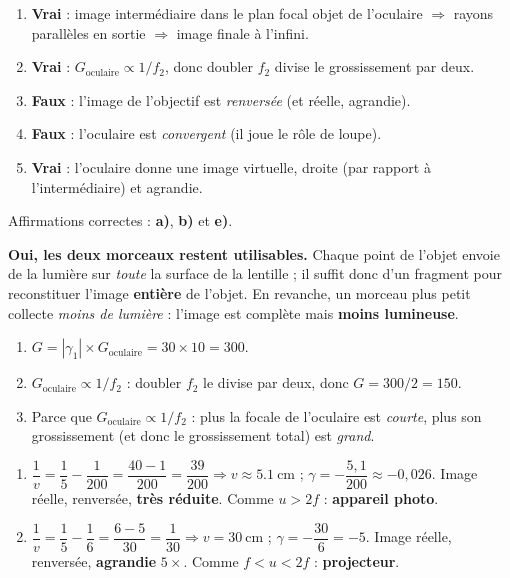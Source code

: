 \documentclass[11pt,a4paper]{article}
\begin{document}

\begin{corrige}
\begin{enumerate}[label=\alph*)]
  \item \textbf{Vrai} : image intermédiaire dans le plan focal objet de l'oculaire $\Rightarrow$
        rayons parallèles en sortie $\Rightarrow$ image finale à l'infini.
  \item \textbf{Vrai} : $G_{\text{oculaire}}\propto 1/f_2$, donc doubler $f_2$ divise le grossissement
        par deux.
  \item \textbf{Faux} : l'image de l'objectif est \emph{renversée} (et réelle, agrandie).
  \item \textbf{Faux} : l'oculaire est \emph{convergent} (il joue le rôle de loupe).
  \item \textbf{Vrai} : l'oculaire donne une image virtuelle, droite (par rapport à l'intermédiaire)
        et agrandie.
\end{enumerate}
Affirmations correctes : \textbf{a)}, \textbf{b)} et \textbf{e)}.
\end{corrige}

\begin{corrige}
\textbf{Oui, les deux morceaux restent utilisables.} Chaque point de l'objet envoie de la lumière sur
\emph{toute} la surface de la lentille ; il suffit donc d'un fragment pour reconstituer l'image
\textbf{entière} de l'objet. En revanche, un morceau plus petit collecte \emph{moins de lumière} :
l'image est complète mais \textbf{moins lumineuse}.
\end{corrige}

\begin{corrige}
\begin{enumerate}[label=\alph*)]
  \item $G=|\gamma_1|\times G_{\text{oculaire}}=30\times 10=300$.
  \item $G_{\text{oculaire}}\propto 1/f_2$ : doubler $f_2$ le divise par deux, donc
        $G=300/2=150$.
  \item Parce que $G_{\text{oculaire}}\propto 1/f_2$ : plus la focale de l'oculaire est \emph{courte},
        plus son grossissement (et donc le grossissement total) est \emph{grand}.
\end{enumerate}
\end{corrige}

\begin{corrige}
\begin{enumerate}[label=\alph*)]
  \item $\dfrac{1}{v}=\dfrac{1}{5}-\dfrac{1}{200}=\dfrac{40-1}{200}=\dfrac{39}{200}\Rightarrow
        v\approx\qty{5.1}{\cm}$ ; $\gamma=-\dfrac{5,1}{200}\approx-0{,}026$. Image réelle, renversée,
        \textbf{très réduite}. Comme $u>2f$ : \textbf{appareil photo}.
  \item $\dfrac{1}{v}=\dfrac{1}{5}-\dfrac{1}{6}=\dfrac{6-5}{30}=\dfrac{1}{30}\Rightarrow v=\qty{30}{\cm}$ ;
        $\gamma=-\dfrac{30}{6}=-5$. Image réelle, renversée, \textbf{agrandie} $5\times$. Comme
        $f<u<2f$ : \textbf{projecteur}.
\end{enumerate}
\end{corrige}
\end{document}
